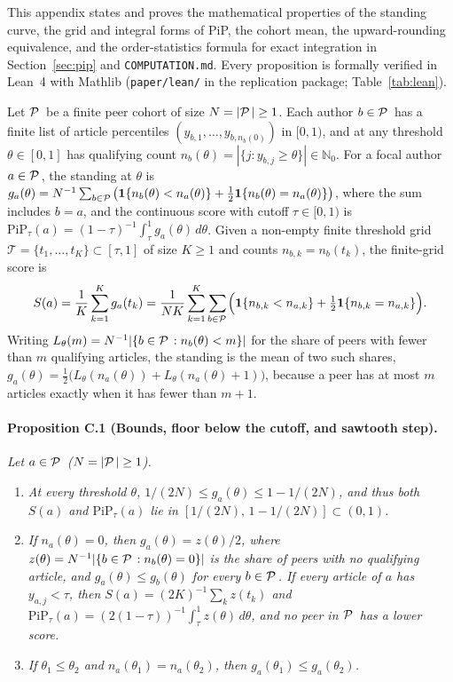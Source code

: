\documentclass[11pt]{article}
\newcommand{\PiP}{\mathrm{PiP}}
\begin{document}
This appendix states and proves the mathematical properties of the standing curve, the grid and integral forms of PiP,
the cohort mean, the upward-rounding equivalence, and the order-statistics formula for exact integration in
Section~\ref{sec:pip} and \texttt{COMPUTATION.md}. Every proposition is formally verified in Lean~4 with Mathlib
(\texttt{paper/lean/} in the replication package; Table~\ref{tab:lean}).

Let ${\mathcal{P}\mkern2.5mu}$ be a finite peer cohort of size $N = |{\mathcal{P}\mkern2.5mu}| \ge 1$. Each author $b \in {\mathcal{P}\mkern2.5mu}$ has a finite list of
article percentiles $(y_{b,1}, \dots, y_{b,n_b(0)})$ in $[0, 1)$, and at any threshold $\theta \in [0, 1]$ has qualifying
count $n_b(\theta) = |\{j : y_{b,j} \ge \theta\}| \in \mathbb{N}_0$. For a focal author $a \in {\mathcal{P}\mkern2.5mu}$, the standing at
$\theta$ is $g_a(\theta) = N^{-1}\sum_{b \in {\mathcal{P}\mkern2.5mu}} \bigl(\mathbf{1}\{n_b(\theta) < n_a(\theta)\} + \tfrac12
\mathbf{1}\{n_b(\theta) = n_a(\theta)\}\bigr)$, where the sum includes $b = a$, and the continuous score with cutoff
$\tau \in [0, 1)$ is $\PiP_\tau(a) = (1-\tau)^{-1}\int_\tau^1 g_a(\theta)\,d\theta$. Given a non-empty finite
threshold grid $\mathcal{T} = \{t_1, \dots, t_K\} \subset [\tau, 1]$ of size $K \ge 1$ and counts $n_{b,k} = n_b(t_k)$,
the finite-grid score is
\begin{equation}
  S(a) = \frac{1}{K}\sum_{k=1}^{K} g_a(t_k)
  = \frac{1}{NK}\sum_{k=1}^{K}\sum_{b \in {\mathcal{P}\mkern2.5mu}} \Bigl(\mathbf{1}\{n_{b,k} < n_{a,k}\} + \tfrac12
  \mathbf{1}\{n_{b,k} = n_{a,k}\}\Bigr).
  \label{eq:gridscore}
\end{equation}
Writing $L_\theta(m) = N^{-1}|\{b \in {\mathcal{P}\mkern2.5mu} : n_b(\theta) < m\}|$ for the share of peers with fewer than $m$ qualifying
articles, the standing is the mean of two such shares, $g_a(\theta) = \tfrac12\bigl(L_\theta(n_a(\theta)) +
L_\theta(n_a(\theta) + 1)\bigr)$, because a peer has at most $m$ articles exactly when it has fewer than $m + 1$.

\paragraph{Proposition C.1 (Bounds, floor below the cutoff, and sawtooth step).}
\emph{Let $a \in {\mathcal{P}\mkern2.5mu}$ ($N = |{\mathcal{P}\mkern2.5mu}| \ge 1$).}
\begin{enumerate}
  \item[(i)] \emph{At every threshold $\theta$, $1/(2N) \le g_a(\theta) \le 1 - 1/(2N)$, and thus both $S(a)$ and
  $\PiP_\tau(a)$ lie in $[1/(2N),\, 1 - 1/(2N)] \subset (0, 1)$.}
  \item[(ii)] \emph{If $n_a(\theta) = 0$, then $g_a(\theta) = z(\theta)/2$, where $z(\theta) = N^{-1}|\{b \in {\mathcal{P}\mkern2.5mu} :
  n_b(\theta) = 0\}|$ is the share of peers with no qualifying article, and $g_a(\theta) \le g_b(\theta)$ for every $b \in
  {\mathcal{P}\mkern2.5mu}$. If every article of $a$ has $y_{a,j} < \tau$, then $S(a) = (2K)^{-1}\sum_{k} z(t_k)$ and $\PiP_\tau(a) =
  (2(1-\tau))^{-1}\int_\tau^1 z(\theta)\,d\theta$, and no peer in ${\mathcal{P}\mkern2.5mu}$ has a lower score.}
  \item[(iii)] \emph{If $\theta_1 \le \theta_2$ and $n_a(\theta_1) = n_a(\theta_2)$, then $g_a(\theta_1) \le
  g_a(\theta_2)$.}
\end{enumerate}
\end{document}
